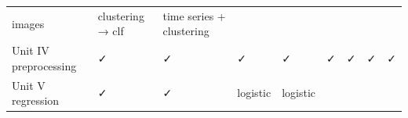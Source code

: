 \documentclass[11pt]{article}
\begin{document}
{\begin{longtable}[]{@{}lllllllll@{}}
\begin{minipage}[t]{0.08\columnwidth}
images\strut
\end{minipage} & \begin{minipage}[t]{0.08\columnwidth}\raggedright
clustering → clf\strut
\end{minipage} & \begin{minipage}[t]{0.08\columnwidth}\raggedright
time series + clustering\strut
\end{minipage}\tabularnewline
\begin{minipage}[t]{0.08\columnwidth}\raggedright
Unit IV preprocessing\strut
\end{minipage} & \begin{minipage}[t]{0.08\columnwidth}\raggedright
✓\strut
\end{minipage} & \begin{minipage}[t]{0.08\columnwidth}\raggedright
✓\strut
\end{minipage} & \begin{minipage}[t]{0.08\columnwidth}\raggedright
✓\strut
\end{minipage} & \begin{minipage}[t]{0.08\columnwidth}\raggedright
✓\strut
\end{minipage} & \begin{minipage}[t]{0.08\columnwidth}\raggedright
✓\strut
\end{minipage} & \begin{minipage}[t]{0.08\columnwidth}\raggedright
✓\strut
\end{minipage} & \begin{minipage}[t]{0.08\columnwidth}\raggedright
✓\strut
\end{minipage} & \begin{minipage}[t]{0.08\columnwidth}\raggedright
✓\strut
\end{minipage}\tabularnewline
\begin{minipage}[t]{0.08\columnwidth}\raggedright
Unit V regression\strut
\end{minipage} & \begin{minipage}[t]{0.08\columnwidth}\raggedright
✓\strut
\end{minipage} & \begin{minipage}[t]{0.08\columnwidth}\raggedright
✓\strut
\end{minipage} & \begin{minipage}[t]{0.08\columnwidth}\raggedright
logistic\strut
\end{minipage} & \begin{minipage}[t]{0.08\columnwidth}\raggedright
logistic\strut

\end{minipage}
\end{longtable}}
\end{document}
